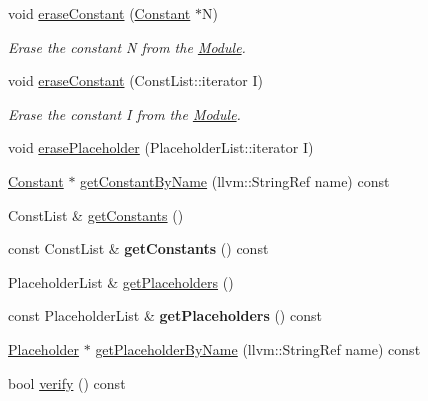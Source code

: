 \begin{DoxyCompactItemize}
void \hyperlink{classglow_1_1_module_aa6f3539108b1e2e1332d26699beeef45}{erase\+Constant} (\hyperlink{classglow_1_1_constant}{Constant} $\ast$N)
\begin{DoxyCompactList}\small\item\em Erase the constant {\ttfamily N} from the \hyperlink{classglow_1_1_module}{Module}. \end{DoxyCompactList}\item 
\mbox{\label{classglow_1_1_module_a8280940a14148e4446e9d5dacc6a050c}} 
void \hyperlink{classglow_1_1_module_a8280940a14148e4446e9d5dacc6a050c}{erase\+Constant} (Const\+List\+::iterator I)
\begin{DoxyCompactList}\small\item\em Erase the constant {\ttfamily I} from the \hyperlink{classglow_1_1_module}{Module}. \end{DoxyCompactList}\item 
void \hyperlink{classglow_1_1_module_a34fbd55051e2bae7bb6fc87881292e69}{erase\+Placeholder} (Placeholder\+List\+::iterator I)
\item 
\hyperlink{classglow_1_1_constant}{Constant} $\ast$ \hyperlink{classglow_1_1_module_a09c077ffe069f8a8299bbeafa840dcb3}{get\+Constant\+By\+Name} (llvm\+::\+String\+Ref name) const
\item 
Const\+List \& \hyperlink{classglow_1_1_module_a07faea735d56effc579009af4a5c0a77}{get\+Constants} ()
\item 
\mbox{\label{classglow_1_1_module_a0206ee2f0d92903d1ff118331db56dc5}} 
const Const\+List \& {\bfseries get\+Constants} () const
\item 
Placeholder\+List \& \hyperlink{classglow_1_1_module_a7ea4ac0582c7231b06575b12bd9e7915}{get\+Placeholders} ()
\item 
\mbox{\label{classglow_1_1_module_a501c574381da6a2517c2d2068c93e0e8}} 
const Placeholder\+List \& {\bfseries get\+Placeholders} () const
\item 
\hyperlink{classglow_1_1_placeholder}{Placeholder} $\ast$ \hyperlink{classglow_1_1_module_a61347fa556eaf4265f5d1d3a9c848a61}{get\+Placeholder\+By\+Name} (llvm\+::\+String\+Ref name) const
\item 
bool \hyperlink{classglow_1_1_module_a4920a99a37f71fa1b75a2f9578d2f6b1}{verify} () const
\item 
\mbox{\label{classglow_1_1_module_ae8d51553337a469c1a2951be4ede1a95}} 

\end{DoxyCompactItemize}
